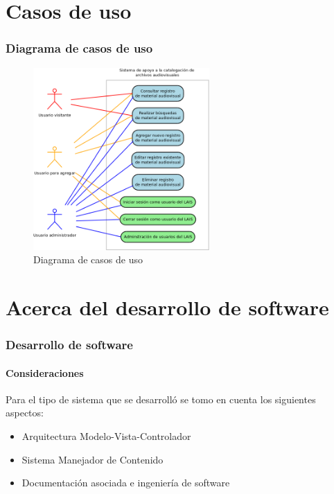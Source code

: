 \documentclass{beamer}
\begin{document}
\section{Casos de uso}
\begin{frame}
	\frametitle{Diagrama de casos de uso}
	\begin{figure}[H]
		\centering
		\includegraphics[width=0.6\textwidth]{CasosDeUso.png}
		\caption{Diagrama de casos de uso}
		\label{fig:caso_de_uso}
	\end{figure}
\end{frame}

\section{Acerca del desarrollo de software}
\begin{frame}
	\frametitle{Desarrollo de software}
	\framesubtitle{Consideraciones}
	Para el tipo de sistema que se desarrolló se tomo en cuenta los siguientes aspectos:
	\begin{itemize}
		\item Arquitectura Modelo-Vista-Controlador
		\item Sistema Manejador de Contenido
		\item Documentación asociada e ingeniería de software
	\end{itemize}
\end{frame}
\end{document}
